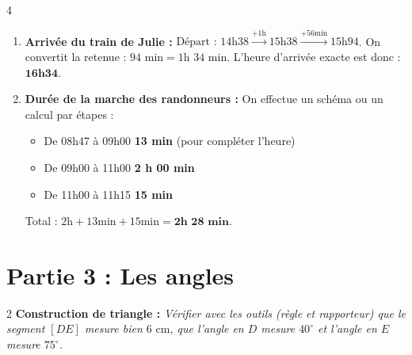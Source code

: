 \documentclass[a4paper]{book}
\begin{document}
{        
    \begin{exerciceNote}{4}
        \begin{enumerate}[leftmargin=*]
            \item \textbf{Arrivée du train de Julie :} \newline
            $\text{Départ : } 14\text{h}38 \xrightarrow{+1\text{h}} 15\text{h}38 \xrightarrow{+56\text{min}} 15\text{h}94$. \newline
            On convertit la retenue : $94\text{ min} = 1\text{h } 34\text{ min}$. \newline
            L'heure d'arrivée exacte est donc : $\mathbf{16\text{h}34}$.
            
            \item \textbf{Durée de la marche des randonneurs :} \newline
            On effectue un schéma ou un calcul par étapes :
            \begin{itemize}
                \item De 08h47 à 09h00 \textrightarrow{} \textbf{13 min} (pour compléter l'heure)
                \item De 09h00 à 11h00 \textrightarrow{} \textbf{2 h 00 min}
                \item De 11h00 à 11h15 \textrightarrow{} \textbf{15 min}
            \end{itemize}
            Total : $2\text{h} + 13\text{min} + 15\text{min} = \mathbf{2\text{h } 28\text{ min}}$.
        \end{enumerate}
    \end{exerciceNote}
    
    
\section*{Partie 3 : Les angles}

        
    \begin{exerciceNote}{2}
        \textbf{Construction de triangle :} \textit{Vérifier avec les outils (règle et rapporteur) que le segment $[DE]$ mesure bien $6\text{ cm}$, que l'angle en $D$ mesure $40^\circ$ et l'angle en $E$ mesure $75^\circ$.}
    
        \begin{center}
\end{center}
\end{exerciceNote}}
\end{document}
